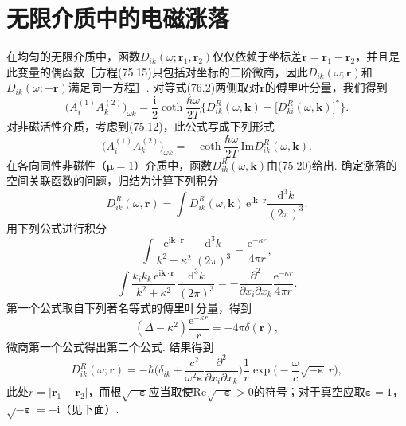 \section{无限介质中的电磁涨落}

在均匀的无限介质中，函数$D_{ik}(\omega;\bm{r}_{1},\bm{r}_{2})$仅仅依赖于坐标差$\bm{r}=\bm{r}_{1}-\bm{r}_{2}$，并且是此变量的偶函数［方程(75.15)只包括对坐标的二阶微商，因此$D_{ik}(\omega;\bm{r})$和$D_{ik}(\omega;-\bm{r})$满足同一方程］. 对等式(76.2)两侧取对$\bm{r}$的傅里叶分量，我们得到
\begin{equation}
\bigl(A_{i}^{(1)}A_{k}^{(2)}\bigr)_{\omega k}=\frac{\mathrm{i}}{2}\coth\frac{\hbar\omega}{2T}
\bigl\{D_{ik}^{R}(\omega,\bm{k})-\bigl[D_{ki}^{R}(\omega,\bm{k})\bigr]^{*}\bigr\}.
\end{equation}
对非磁活性介质，考虑到(75.12)，此公式写成下列形式
\begin{equation}
\bigl(A_{i}^{(1)}A_{k}^{(2)}\bigr)_{\omega k}=-\coth\frac{\hbar\omega}{2T}\,\mathrm{Im}D_{ik}^{R}(\omega,\bm{k}).
\end{equation}
在各向同性非磁性（$\bm{\mu}=1$）介质中，函数$D_{ik}^{R}(\omega,\bm{k})$由(75.20)给出. 确定涨落的空间关联函数的问题，归结为计算下列积分
\begin{equation}
D_{ik}^{R}(\omega,\bm{r})=\int D_{ik}^{R}(\omega,\bm{k})\,\mathrm{e}^{\mathrm{i}\bm{k}\cdot\bm{r}}\frac{\mathrm{d}^{3}k}{(2\pi)^{3}}.
\end{equation}
用下列公式进行积分
\begin{equation*}
\int\frac{\mathrm{e}^{\mathrm{i}\bm{k}\cdot\bm{r}}}{k^{2}+\kappa^{2}}\,\frac{\mathrm{d}^{3}k}{(2\pi)^{3}}=\frac{\mathrm{e}^{-\kappa r}}{4\pi r},
\end{equation*}
\begin{equation}
\int\frac{k_{i}k_{k}\,\mathrm{e}^{\mathrm{i}\bm{k}\cdot\bm{r}}}{k^{2}+\kappa^{2}}\,\frac{\mathrm{d}^{3}k}{(2\pi)^{3}}=-\frac{\partial^{2}}{\partial x_{i}\partial x_{k}}\frac{\mathrm{e}^{-\kappa r}}{4\pi r}.
\end{equation}
第一个公式取自下列著名等式的傅里叶分量，得到
\begin{equation}
(\Delta-\kappa^{2})\frac{\mathrm{e}^{-\kappa r}}{r}=-4\pi\delta(\bm{r}),
\end{equation}
微商第一个公式得出第二个公式. 结果得到
\begin{equation}
D_{ik}^{R}(\omega;\bm{r})=-\hbar\biggl(\delta_{ik}+\frac{c^{2}}{\omega^{2}\bm{\varepsilon}}\frac{\partial^{2}}{\partial x_{i}\partial x_{k}}\biggr)\frac{1}{r}\exp\biggl(-\frac{\omega}{c}\sqrt{-\bm{\varepsilon}}\,r\biggr),
\end{equation}
此处$r=|\bm{r}_{1}-\bm{r}_{2}|$，而根$\sqrt{-\bm{\varepsilon}}$应当取使$\mathrm{Re}\sqrt{-\bm{\varepsilon}}>0$的符号；对于真空应取$\bm{\varepsilon}=1$，$\sqrt{-\bm{\varepsilon}}=-\mathrm{i}$（见下面）.

